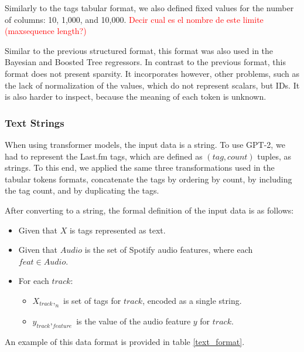 \documentclass[sn-mathphys]{sn-jnl}%
\theoremstyle{thmstyleone}%
\theoremstyle{thmstyletwo}%
\theoremstyle{thmstylethree}%
\begin{document}
Similarly to the tags tabular format, we also defined fixed values for the number of columns: 10, 1,000, and 10,000.
\textcolor{red}{Decir cual es el nombre de este limite (maxsequence length?)}


Similar to the previous structured format, this format was also used in the Bayesian and Boosted Tree regressors.
In contrast to the previous format, this format does not present sparsity.
It incorporates however, other problems, such as the lack of normalization of the values, which do not represent scalars, but IDs.
It is also harder to inspect, because the meaning of each token is unknown.


\subsubsection{Text Strings}

When using transformer models, the input data is a string.
To use GPT-2, we had to represent the Last.fm tags, which are defined as $(tag, count)$ tuples, as strings.
To this end, we applied the same three transformations used in the tabular tokens formats,
concatenate the tags by ordering by count, by including the tag count, and by duplicating the tags.

After converting to a string, the formal definition of the input data is as follows:

\begin{itemize}
      \item Given that $X$ is tags represented as text.
      \item Given that $Audio$ is the set of Spotify audio features, where each $feat \in Audio$.
      \item For each $track$:
      \begin{itemize}
            \item $X_{track},_{n}$ is set of tags for $track$, encoded as a single string.
            \item $y_{track},_{feature}$ is the value of the audio feature $y$ for $track$.
      \end{itemize}
\end{itemize}

An example of this data format is provided in table \ref{text_format}.
\end{document}
